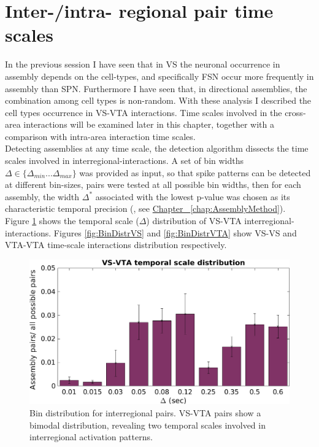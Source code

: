 \section{Inter-/intra- regional pair time scales}
\label{sec:TimeScales}
In the previous session I have seen that in VS the neuronal occurrence in assembly depends on the cell-types, and specifically FSN occur more frequently in assembly than SPN. Furthermore I have seen that, in directional assemblies, the combination among cell types is non-random. With these analysis I described the cell types occurrence in VS-VTA interactions. Time scales involved in the cross-area interactions will be examined later in this chapter, together with a comparison with intra-area interaction time scales.\\
Detecting assemblies at any time scale, the detection algorithm dissects the time scales involved in interregional-interactions. A set of bin widths $\Delta \in \{\Delta_{min}...\Delta_{max}\}$ was provided as input, so that spike patterns can be detected at different bin-sizes, pairs were tested at all possible bin widths, then for each assembly, the width $\Delta^*$ associated with the lowest p-value was chosen as its characteristic temporal precision (\cite{RussoDurstewitz}, see \hyperref[chap:AssemblyMethod]{Chapter~ \ref*{chap:AssemblyMethod}}).\\
Figure \ref{fig:BinDistr} shows the temporal scale ($\Delta$) distribution of VS-VTA interregional-interactions. Figures \ref{fig:BinDistrVS} and \ref{fig:BinDistrVTA} show VS-VS and VTA-VTA time-scale interactions distribution respectively.
\begin{figure}[H]
\centering
\includegraphics[scale=0.44]{figures/VS_VTA_Short1.png}
\caption{Bin distribution for interregional pairs. VS-VTA pairs show a bimodal distribution, revealing two temporal scales involved in interregional activation patterns.}
\label{fig:BinDistr}
\end{figure}
